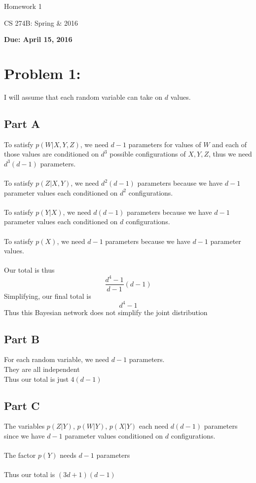 \documentclass[twoside,11pt]{article}
\theoremstyle{definition}
\begin{document}
\centerline{\Large Homework 1}
\centerline{CS 274B: Spring \& 2016}
\centerline{\bf Due: April 15, 2016}

\section*{Problem 1: }

I will assume that each random variable can take on $d$ values.

\subsection*{Part A}

To satisfy $p(W|X,Y,Z)$, we need $d-1$ parameters for values of $W$ and each of those values are conditioned on $d^3$ possible configurations of $X,Y,Z$, thus we need $d^3(d-1)$ parameters.\\
\\
To satisfy $p(Z|X,Y)$, we need $d^2(d-1)$ parameters because we have $d-1$ parameter values each conditioned on $d^2$ configurations. \\
\\
To satisfy $p(Y|X)$, we need $d(d-1)$ parameters because we have $d-1$ parameter values each conditioned on $d$ configurations.\\
\\
To satisfy $p(X)$, we need $d-1$ parameters because we have $d-1$ parameter values.\\
\\
Our total is thus
\[
\frac{d^4-1}{d-1}(d-1)
\]
Simplifying, our final total is
\[
d^4-1
\]
Thus this Bayesian network does not simplify the joint distribution

\subsection*{Part B}

For each random variable, we need $d-1$ parameters. \\
They are all independent\\
Thus our total is just $4(d-1)$

\subsection*{Part C}

The variables $p(Z|Y)$, $p(W|Y)$, $p(X|Y)$ each need $d(d-1)$ parameters since we have $d-1$ parameter values conditioned on $d$ configurations.\\
\\
The factor $p(Y)$ needs $d-1$ parameters\\
\\
Thus our total is $(3d+1)(d-1)$
\end{document}

